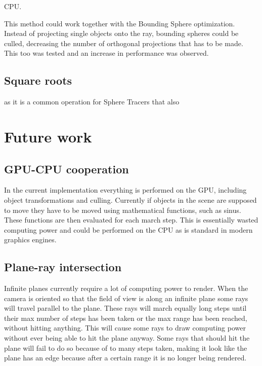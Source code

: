 			CPU.

			This method could work together with the Bounding Sphere 
			optimization. Instead of projecting single objects onto the ray,
			bounding spheres could be culled, decreasing the number of 
			orthogonal projections that has to be made. This too was tested 
			and an increase in performance was observed.

		\subsection{Square roots}

			as it is a common operation for Sphere Tracers that also
		

	\section{Future work}

		\subsection{GPU-CPU cooperation}

            In the current implementation everything is performed on the GPU,
            including object transformations and culling. Currently if objects 
            in the scene are supposed to move they have to be moved using 
            mathematical functions, such as sinus. These functions are then evaluated for each march step. This is essentially wasted computing power and could be performed on the CPU as is standard in modern graphics engines.



		\subsection{Plane-ray intersection}

			Infinite planes currently require a lot of computing power to
			render. When the camera is oriented so that the field of view is
			along an infinite plane some rays will travel parallel to the
			plane. These rays will march equally long steps until their max
			number of steps has been taken or the max range has been reached, without hitting anything. This will cause some rays to draw computing power without ever being able to hit the plane anyway. Some rays that should hit the plane will fail to do so because of to many steps taken, making it look like the plane has an edge because after a certain range it is no longer being rendered.


